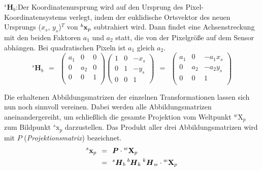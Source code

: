 \noindent$^s\boldsymbol{H}_b$:\quad Der Koordinatenursprung wird auf den Ursprung des Pixel-Ko\-or\-di\-na\-ten\-sys\-tems verlegt, indem der euklidische Ortsvektor des neuen Ursprungs ($x_s$, $y_s$)$^T$ von $^b\boldsymbol{\mathrm{x}}_p$ subtrahiert wird. Dann findet eine Achsenstreckung mit den beiden Faktoren $a_1$ und $a_2$ statt, die von der Pixelgröße auf dem Sensor abhängen. Bei quadratischen Pixeln ist $a_1$ gleich $a_2$.
\begin{equation}
	^s\boldsymbol{H}_b {\:\:}={\:\:} \begin{pmatrix}a_1&0&0\\0&a_2&0\\0&0&1\\\end{pmatrix} \begin{pmatrix}1&0&-x_s\\0&1&-y_s\\0&0&1\end{pmatrix} {\:\:}={\:\:} \begin{pmatrix}a_1&0&-a_1x_s\\0&a_2&-a_2y_s\\0&0&1\\\end{pmatrix}
\end{equation}

\grosserabstand
Die erhaltenen Abbildungsmatrizen der einzelnen Transformationen lassen sich nun noch sinnvoll vereinen. Dabei werden alle Abbildungsmatrizen aneinandergereiht, um schließlich die gesamte Projektion vom Weltpunkt $^w\mathrm{X}_p$ zum Bildpunkt $^s\mathrm{x}_p$ darzustellen. Das Produkt aller drei Abbildungsmatrizen wird mit $P$ (\emph{Projektionsmatrix}) bezeichnet.
\begin{align}
	{^s\boldsymbol{\mathrm{x}}_p} {\:\:}&={\:\:} \boldsymbol{P}\cdot{^w\boldsymbol{\mathrm{X}}_p}\\
	&={\:\:} {^s\boldsymbol{H}_b}\:{^b\boldsymbol{H}_k}\:{^k\boldsymbol{H}_w}\cdot{^w\boldsymbol{\mathrm{X}}_p}
\end{align}\kleinerabstand

